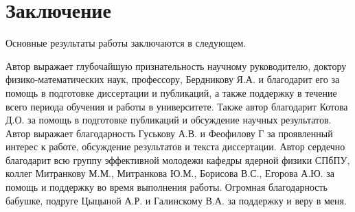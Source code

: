 \chapter*{Заключение}                       %


Основные результаты работы заключаются в следующем.


Автор выражает глубочайшую признательность научному руководителю, доктору физико-математических наук, профессору, Бердникову Я.А. и благодарит его за помощь в подготовке диссертации и публикаций, а также поддержку в течение всего периода обучения и работы в университете. Также автор благодарит Котова Д.О. за помощь в подготовке публикаций и обсуждение научных результатов. Автор выражает благодарность Гуськову А.В. и Феофилову Г за проявленный интерес к работе, обсуждение результатов и текста диссертации. Автор сердечно благодарит всю группу эффективной молодежи кафедры ядерной физики СПбПУ, коллег Митранкову М.М., Митранкова Ю.М., Борисова В.С., Егорова А.Ю. за помощь и поддержку во время выполнения работы.
Огромная благодарность бабушке, подруге Цыцыной А.Р. и Галинскому В.А. за поддержку и веру в меня.

